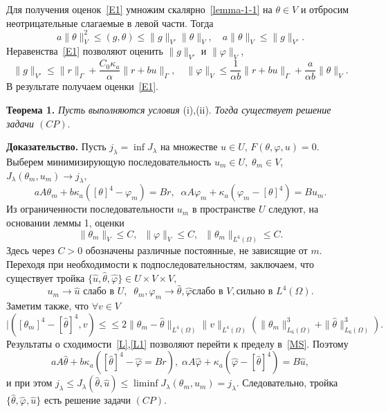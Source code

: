 \documentclass[12pt]{article}
\begin{document}
    Для получения оценок~\eqref{E1} умножим скалярно~\eqref{lemma-1-1}
    на $\theta \in V$ и отбросим неотрицательные слагаемые в левой части.
    Тогда
    \[
        a \|\theta\|^2_V \leq (g, \theta) \leq \|g\|_{V'}\|\theta\|_V,
        \quad a\|\theta\|_V \leq \|g\|_{V'}.
    \]
    Неравенства~\eqref{E1} позволяют оценить $\|g\|_{V'}$ и $\|\varphi\|_V $,
    \[
        \|g\|_{V'} \leq \|r\|_\Gamma + \frac{C_0\kappa_a}{\alpha}\|r + bu\|_\Gamma, \quad
        \|\varphi\|_V \leq \frac{1}{\alpha b} \|r + bu\|_\Gamma + \frac{a}{\alpha b} \|\theta\|_V.
    \]
    В результате получаем оценки~\eqref{E1}.

    \textbf{Теорема 1.}
    \textit{ Пусть выполняются условия} (i),(ii).
    \textit{ Тогда существует решение задачи $(CP).$}

    \textbf{ Доказательство.}
    Пусть $j_\lambda = \inf J_\lambda$ на множестве $u \in U$, $F(\theta, \varphi, u)=0.$
    Выберем минимизирующую последовательность
    $u_m \in U, \; \theta_m \in V$, $J_\lambda(\theta_m, u_m)
    \rightarrow j_\lambda,$
    \begin{equation}
        \label{MS}
        a A \theta_m +b \kappa_a([\theta]^4 - \varphi_m) = Br, \;\;
        \alpha A \varphi_m + \kappa_a (\varphi_m - [\theta]^4) = B u_m.
    \end{equation}
    Из ограниченности последовательности $u_m$ в пространстве $U$ следуют, на основании
    леммы 1, оценки
    \[
        \|\theta_m\|_V \leq C,\;\;
        \|\varphi\|_V \leq C,\;\;\|\theta_m\|_{L^6(\Omega)} \leq C.
    \]
    Здесь через $C>0$ обозначены различные постоянные, не зависящие от $m$.
    Переходя при необходимости к подпоследовательностям, заключаем, что
    существует тройка $\{ \hat{u}, \hat{\theta}, \hat{\varphi} \} \in U \times V \times V,$
    \begin{equation}
        \label{L}
        u_m \rightarrow \hat{u} \text{  слабо в } U, \;\;
        \theta_m, \varphi_m \rightarrow \hat{\theta}, \hat{\varphi} \text{
            слабо в } V, \text{
            сильно в } L^4(\Omega).
    \end{equation}
    Заметим также, что $\forall v \in V$
    \begin{equation}
        \label{L1}
        |( [\theta_m]^4 - [\hat{\theta}]^4, v) \leq
        \leq 2 \| \theta_m - \hat{\theta}\|_{L^4(\Omega)} \|v\|_{L^4(\Omega)}
        \left( \| \theta_m \|^3_{L_6(\Omega)} + \| \hat{\theta} \|^3_{L_6(\Omega)}\right).
    \end{equation}
    Результаты о сходимости~\eqref{L},\eqref{L1} позволяют перейти
    к пределу в~\eqref{MS}.
    Поэтому
    \[
        a A \hat{\theta} + b \kappa_a ([\hat{\theta}]^4 - \hat{\varphi} = Br), \;
        \alpha A \hat{\varphi} + \kappa_a (\hat{\varphi} -[\hat{\theta}]^4) = B \hat{u},
    \]
    и при этом
    $j_\lambda \leq J_\lambda(\hat{\theta}, \hat{u}) \leq \liminf J_\lambda(\theta_m, u_m)=j_\lambda$.
    Следовательно, тройка $\{\hat{\theta}, \hat{\varphi}, \hat{u} \}$ есть решение задачи $(CP).$
\end{document}
